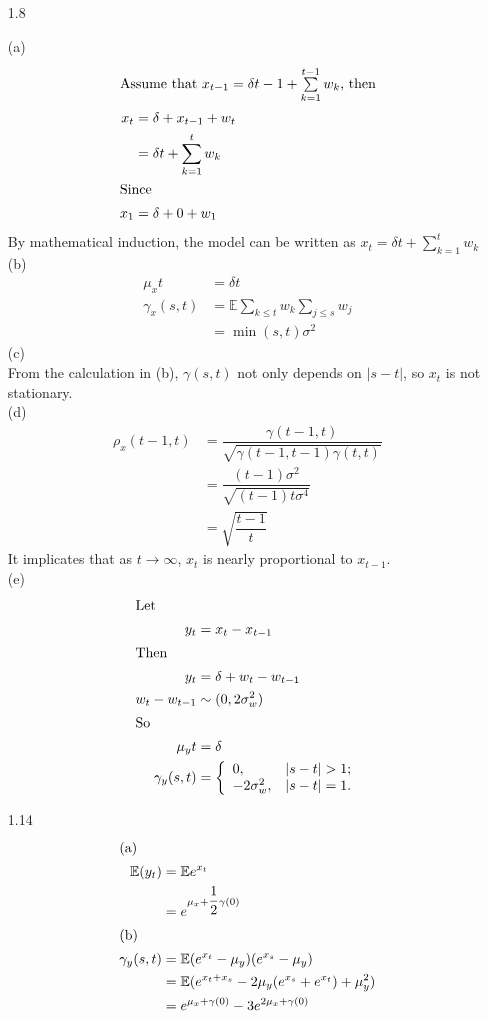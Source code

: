 \documentclass{article}
\newcommand{\ix}[1]{\intertext{{}#1}}
\begin{document}
\begin{CJK*}{GBK}{song}
\begin{enumerate}
\item[1.8]

(a)
\begin{align*}
\ix{Assume that $x_{t-1}=\delta {t-1}+\sum\limits_{k=1}^{t-1} w_k$, then}
     x_t&= \delta+x_{t-1}+w_t\\
        &= \delta t+ \sum\limits_{k=1}^{t} w_k\\
\ix{Since} x_1&=\delta+0+w_1
\end{align*}
By mathematical induction, the model can be written as $x_t= \delta t+ \sum\limits_{k=1}^{t} w_k$
(b)\\
\begin{align*}
\mu_xt&=\delta t\\
\gamma_x(s,t)&=\mathbb{E}\sum\limits_{k\le t} w_k \sum\limits_{j\le s} w_j\\
&=\min(s,t)\sigma^2
\end{align*}
(c)\\
From the calculation in (b), $\gamma(s,t)$ not only depends on $|s-t|$, so $x_t$ is not stationary.\\
(d)\\

\begin{align*}
\rho_x(t-1,t)&=\dfrac{\gamma(t-1,t)}{\sqrt{\gamma(t-1,t-1)\gamma(t,t)}}\\
&=\dfrac{(t-1)\sigma^2}{\sqrt{(t-1)t\sigma^4}}\\
&=\sqrt{\dfrac{t-1}{t}}
\end{align*}
It implicates that as $t\rightarrow\infty$, $x_t$ is nearly proportional to $x_{t-1}$.\\
(e)\\
\begin{align*}
\ix{Let}y_t&= x_t-x_{t-1}\\
\ix{Then}y_t&=\delta + w_t-w_{t-1}\\
w_t-w_{t-1}&\sim (0,2\sigma_w^2)\\
\ix{So}\mu_yt&=\delta\\
\gamma_y(s,t)&=\left\{
                 \begin{array}{ll}
                   0, & \hbox{$|s-t|>1$;} \\
                   -2\sigma_w^2, & \hbox{$|s-t|=1$.}
                 \end{array}
               \right.
\end{align*}
\item[1.14]
\begin{align*}
\ix{(a)}    \mathbb{E}(y_t)&= \mathbb{E}e^{x_t}\\
        &=e^{\mu_x+\dfrac{1}{2}\gamma(0)}\\
\ix{(b)}     \gamma_y(s,t)&= \mathbb{E}(e^{x_t}-\mu_y)(e^{x_s}-\mu_y)\\
        &=\mathbb{E}(e^{x_t+x_s}-2\mu_y(e^{x_s}+e^{x_t})+\mu_y^2)\\
        &=e^{\mu_x+\gamma(0)}-3e^{2\mu_x+\gamma(0)}
\end{align*}


\end{enumerate}
\end{CJK*}
\end{document}
